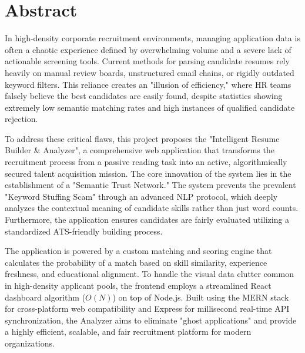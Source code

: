\documentclass[12pt,a4paper]{report}
\begin{document}
\chapter*{Abstract}

In high-density corporate recruitment environments, managing application data is often a chaotic experience defined by overwhelming volume and a severe lack of actionable screening tools. Current methods for parsing candidate resumes rely heavily on manual review boards, unstructured email chains, or rigidly outdated keyword filters. This reliance creates an "illusion of efficiency," where HR teams falsely believe the best candidates are easily found, despite statistics showing extremely low semantic matching rates and high instances of qualified candidate rejection.

To address these critical flaws, this project proposes the "Intelligent Resume Builder \& Analyzer", a comprehensive web application that transforms the recruitment process from a passive reading task into an active, algorithmically secured talent acquisition mission. The core innovation of the system lies in the establishment of a "Semantic Trust Network." The system prevents the prevalent "Keyword Stuffing Scam" through an advanced NLP protocol, which deeply analyzes the contextual meaning of candidate skills rather than just word counts. Furthermore, the application ensures candidates are fairly evaluated utilizing a standardized ATS-friendly building process. 

The application is powered by a custom matching and scoring engine that calculates the probability of a match based on skill similarity, experience freshness, and educational alignment. To handle the visual data clutter common in high-density applicant pools, the frontend employs a streamlined React dashboard algorithm ($O(N)$) on top of Node.js. Built using the MERN stack for cross-platform web compatibility and Express for millisecond real-time API synchronization, the Analyzer aims to eliminate "ghost applications" and provide a highly efficient, scalable, and fair recruitment platform for modern organizations.

\newpage

\tableofcontents

\newpage
{}
\listoffigures
\end{document}
